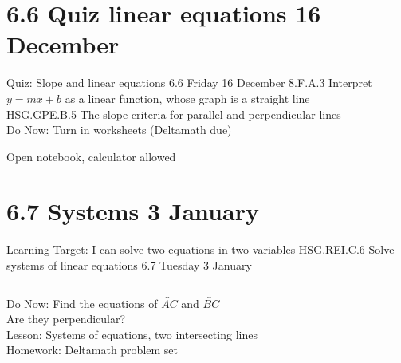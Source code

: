 \section{6.6 Quiz linear equations \hfill 16 December \,}
\begin{frame}{Quiz: Slope and linear equations \hfill \alert{6.6 Friday 16 December}}
  8.F.A.3 Interpret $y=mx+b$ as a linear function, whose graph is a straight line \\
  HSG.GPE.B.5 The slope criteria for parallel and perpendicular lines \\ \vspace{1cm}
  Do Now: Turn in worksheets (Deltamath due) \vspace{0.5cm}
  \begin{block}{Open notebook, calculator allowed}
  \end{block} \vspace{2cm}
\end{frame}

\section{6.7 Systems \hfill 3 January \,}
\begin{frame}{Learning Target: I can solve two equations in two variables}
  {HSG.REI.C.6 Solve systems of linear equations \hfill \alert{6.7 Tuesday 3 January}}
  \begin{columns}
      Do Now: Find the equations of $\overleftrightarrow{AC}$ and  $\overleftrightarrow{BC}$\\
      Are they perpendicular? \\[1cm]
      Lesson: Systems of equations, two intersecting lines \\
      Homework: Deltamath problem set
    \begin{flushright}
    \end{flushright}
  \end{columns}
\end{frame}


